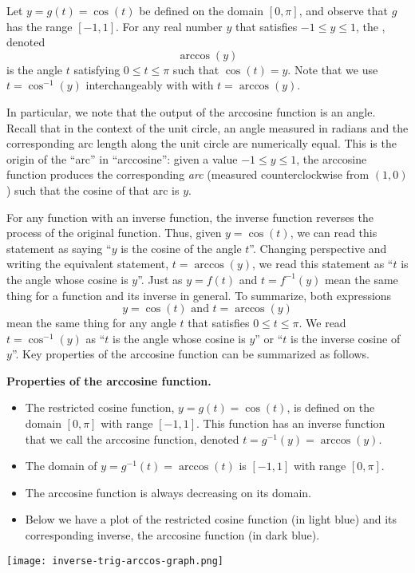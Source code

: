 \documentclass{ximera}
\begin{document}
\begin{definition}
Let $y = g(t) = \cos(t)$ be defined on the domain $[0,\pi]$, and observe that $g$ has the range $[-1,1]$.  For any real number $y$ that satisfies $-1 \leq y \leq 1$, the , denoted%
\begin{equation*}
\arccos(y)
\end{equation*}
is the angle $t$ satisfying $0 \leq t \leq \pi$ such that $\cos(t) = y$.
%
Note that we use $t=\cos^{-1}(y)$ interchangeably with with $t = \arccos(y)$.
\end{definition}

In particular, we note that the output of the arccosine function is an angle. Recall that in the context of the unit circle, an angle measured in radians and the corresponding arc length along the unit circle are numerically equal. This is the origin of the ``arc'' in ``arccosine'': given a value $-1 \leq y \leq 1$, the arccosine function produces the corresponding \emph{arc} (measured counterclockwise from $(1,0)$) such that the cosine of that arc is $y$.%
\par
For any function with an inverse function, the inverse function reverses the process of the original function. Thus, given $y = \cos(t)$, we can read this statement as saying ``$y$ is the cosine of the angle $t$''.  Changing perspective and writing the equivalent statement, $t = \arccos(y)$, we read this statement as ``$t$ is the angle whose cosine is $y$''.  Just as $y = f(t)$ and $t = f^{-1}(y)$ mean the same thing for a function and its inverse in general. 
To summarize, both expressions
\begin{equation*}
y = \cos(t) \text{ and } t = \arccos(y)
\end{equation*}
mean the same thing for any angle $t$ that satisfies $0 \leq t \leq \pi$.  
We read $t = \cos^{-1}(y)$ as ``$t$ is the angle whose cosine is $y$'' or ``$t$ is the inverse cosine of $y$''.  Key properties of the arccosine function can be summarized as follows.%

\begin{callout}{\bf Properties of the arccosine function.}%
\begin{itemize}
\item
The restricted cosine function, $y = g(t) = \cos(t)$, is defined on the domain $[0,\pi]$ with range $[-1,1]$.  This function has an inverse function that we call the arccosine function, denoted $t = g^{-1}(y) = \arccos(y)$.%
\item
The domain of $y = g^{-1}(t) = \arccos(t)$ is $[-1,1]$ with range $[0,\pi]$.%
\item
The arccosine function is always decreasing on its domain.%
\item
Below we have a plot of the restricted cosine function (in light blue) and its corresponding inverse, the arccosine function (in dark blue).%
\end{itemize}
\texttt{[image: inverse-trig-arccos-graph.png]}
\end{callout}
\end{document}
